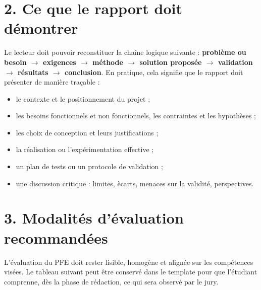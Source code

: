 
\section*{2. Ce que le rapport doit d\'emontrer}

Le lecteur doit pouvoir reconstituer la cha\^ine logique suivante : \textbf{probl\`eme ou besoin $\rightarrow$ exigences $\rightarrow$ m\'ethode $\rightarrow$ solution propos\'ee $\rightarrow$ validation $\rightarrow$ r\'esultats $\rightarrow$ conclusion}. En pratique, cela signifie que le rapport doit pr\'esenter de mani\`ere tra\c{c}able :

\begin{itemize}[leftmargin=1.2cm]
\item le contexte et le positionnement du projet ;
\item les besoins fonctionnels et non fonctionnels, les contraintes et les hypoth\`eses ;
\item les choix de conception et leurs justifications ;
\item la r\'ealisation ou l'exp\'erimentation effective ;
\item un plan de tests ou un protocole de validation ;
\item une discussion critique : limites, \`ecarts, menaces sur la validit\'e, perspectives.
\end{itemize}


\section*{3. Modalit\'es d'\'evaluation recommand\'ees}

L'\'evaluation du PFE doit rester lisible, homog\`ene et align\'ee sur les comp\'etences vis\'ees. Le tableau suivant peut \^etre conserv\'e dans le template pour que l'\'etudiant comprenne, d\`es la phase de r\'edaction, ce qui sera observ\'e par le jury.

